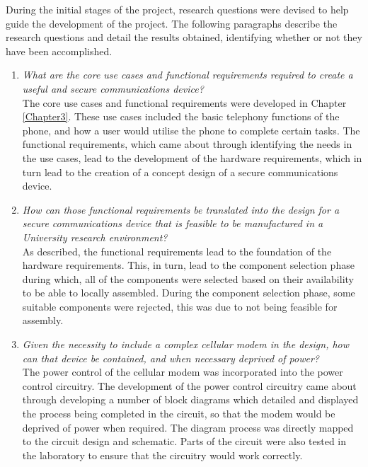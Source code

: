 During the initial stages of the project, research questions were devised to help guide the development of the project.
The following paragraphs describe the research questions and detail the results obtained, identifying whether or not they have been accomplished.\\

\begin{enumerate}
\item \textit{What are the core use cases and functional requirements required to create a useful and secure communications device?}\\

	The core use cases and functional requirements were developed in Chapter \ref{Chapter3}. 
These use cases included the basic telephony functions of the phone, and how a user would utilise the phone to complete certain tasks. 
The functional requirements, which came about through identifying the needs in the use cases, lead to the development of the hardware requirements, which in turn lead to the creation of a concept design of a secure communications device.\\

\item \textit{How can those functional requirements be translated into the design for a secure communications device that is feasible to be manufactured in a University research environment?}\\

	As described, the functional requirements lead to the foundation of the hardware requirements. This, in turn, lead to the component selection phase during which, all of the components were selected based on their availability to be able to locally assembled.
During the component selection phase, some suitable components were rejected, this was due to not being feasible for assembly.\\

\item \textit{Given the necessity to include a complex cellular modem in the design, how can that device be contained, and when necessary deprived of power?}\\

	The power control of the cellular modem was incorporated into the power control circuitry. 
The development of the power control circuitry came about through developing a number of block diagrams which detailed and displayed the process being completed in the circuit, so that the modem would be deprived of power when required. 
The diagram process was directly mapped to the circuit design and schematic. Parts of the circuit were also tested in the laboratory to ensure that the circuitry would work correctly. \\


\end{enumerate}
